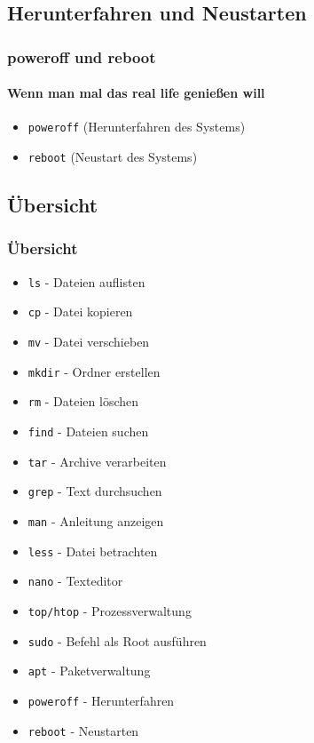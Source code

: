 \documentclass[12pt,utf8]{beamer}
\begin{document}
\subsection{Herunterfahren und Neustarten}
\begin{frame}
\frametitle{poweroff und reboot}
\framesubtitle{Wenn man mal das real life genießen will}
\begin{itemize}
	\item \texttt{poweroff} (Herunterfahren des Systems)
	\item \texttt{reboot} (Neustart des Systems)
\end{itemize}
\end{frame}

\subsection{Übersicht}
\begin{frame}
\frametitle{\LARGE Übersicht}
\small
\begin{minipage}{0.48\linewidth}
	\begin{itemize}
		\item \texttt{ls} - Dateien auflisten
		\item \texttt{cp} - Datei kopieren
		\item \texttt{mv} - Datei verschieben
		\item \texttt{mkdir} - Ordner erstellen
		\item \texttt{rm} - Dateien löschen
		\item \texttt{find} - Dateien suchen
		\item \texttt{tar} - Archive verarbeiten
		\item \texttt{grep} - Text durchsuchen
		\item \texttt{man} - Anleitung anzeigen
	\end{itemize}
\end{minipage}
\begin{minipage}{0.48\linewidth}
	\begin{itemize}
		\item \texttt{less} - Datei betrachten
		\item \texttt{nano} - Texteditor
		\item \texttt{top/htop} - Prozessverwaltung
		\item \texttt{sudo} - Befehl als Root ausführen
		\item \texttt{apt} - Paketverwaltung
		\item \texttt{poweroff} - Herunterfahren
		\item \texttt{reboot} - Neustarten
	\end{itemize}
\end{minipage}

\end{frame}
\end{document}
